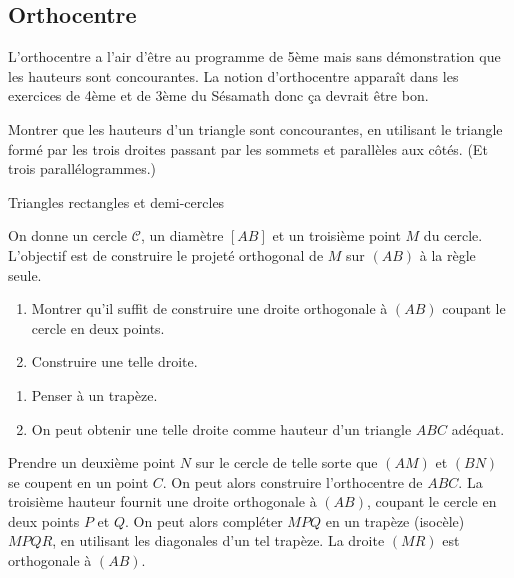 \subsection{Orthocentre}

L'orthocentre a l'air d'être au programme de 5ème mais sans démonstration que les hauteurs sont concourantes. La notion d'orthocentre apparaît dans les exercices de 4ème et de 3ème du Sésamath donc ça devrait être bon.

\begin{exo}
Montrer que les hauteurs d'un triangle sont concourantes, en utilisant le triangle formé par les trois droites passant par les sommets et parallèles aux côtés. (Et trois parallélogrammes.)
\begin{hint}
\end{hint}
\end{exo}


\begin{exo}
\begin{prerequis}
Triangles rectangles et demi-cercles
\end{prerequis}
On donne  un cercle $\mathcal C$, un diamètre $[AB]$ et un troisième point $M$ du cercle. L'objectif est de construire le projeté orthogonal de $M$ sur $(AB)$ à la règle seule.
\begin{enumerate}
\item Montrer qu'il suffit de construire une droite orthogonale à $(AB)$ coupant le cercle en deux points.
\item Construire une telle droite.
\end{enumerate}

\begin{hint}
\begin{enumerate}
\item Penser à un trapèze.
\item On peut obtenir une telle droite comme hauteur d'un triangle $ABC$ adéquat.
\end{enumerate}
\end{hint}      
\begin{sol} 
Prendre un deuxième point $N$ sur le cercle de telle sorte que $(AM)$ et $(BN)$ se coupent en un point $C$. On peut alors construire l'orthocentre de $ABC$. La troisième hauteur fournit une droite orthogonale à $(AB)$, coupant le cercle en deux points $P$ et $Q$. On peut alors compléter $MPQ$ en un trapèze (isocèle) $MPQR$, en utilisant les diagonales d'un tel trapèze. La droite $(MR)$ est orthogonale à $(AB)$.
\end{sol}  
\end{exo}  



